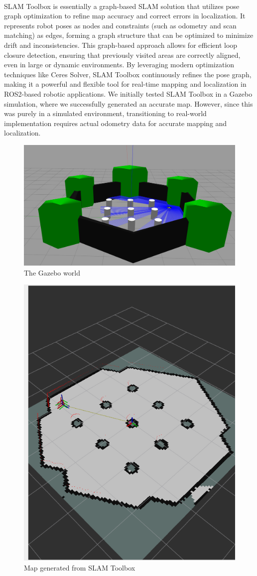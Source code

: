 \paragraph*{}
SLAM Toolbox is essentially a graph-based SLAM solution that utilizes pose graph optimization to refine map accuracy and correct errors in localization. It represents robot poses as nodes and constraints (such as odometry and scan matching) as edges, forming a graph structure that can be optimized to minimize drift and inconsistencies. This graph-based approach allows for efficient loop closure detection, ensuring that previously visited areas are correctly aligned, even in large or dynamic environments. By leveraging modern optimization techniques like Ceres Solver, SLAM Toolbox continuously refines the pose graph, making it a powerful and flexible tool for real-time mapping and localization in ROS2-based robotic applications. We initially tested SLAM Toolbox in a Gazebo simulation, where we successfully generated an accurate map. However, since this was purely in a simulated environment, transitioning to real-world implementation requires actual odometry data for accurate mapping and localization.

\begin{figure} [H]
    \centering
    \includegraphics[width=0.5\linewidth]{assets/images/slam/gazebo_test_world.png}
    \caption{The Gazebo world}
    \label{fig:gazebo_map}
\end{figure}

\begin{figure} [H]
    \centering
    \includegraphics[width=0.5\linewidth]{assets/images/slam/slam_toolbox.png}
    \caption{Map generated from SLAM Toolbox}
    \label{fig:graph_slam_map}
\end{figure}

